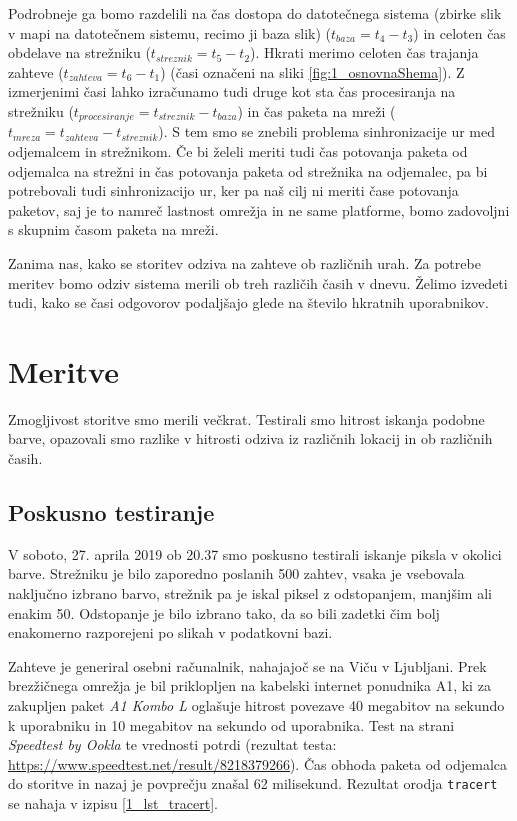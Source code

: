 Podrobneje ga bomo razdelili na čas dostopa do datotečnega sistema (zbirke slik v mapi na datotečnem sistemu, recimo ji baza slik) ($t_{baza} = t_4 - t_3$) in celoten čas obdelave na strežniku ($t_{streznik} = t_5 - t_2$). Hkrati merimo celoten čas trajanja zahteve ($t_{zahteva} = t_6 - t_1$) (časi označeni na sliki \ref{fig:1_osnovnaShema}). Z izmerjenimi časi lahko izračunamo tudi druge kot sta čas procesiranja na strežniku ($t_{procesiranje} = t_{streznik} - t_{baza}$) in čas paketa na mreži ($t_{mreza} = t_{zahteva} - t_{streznik}$). S tem smo se znebili problema sinhronizacije ur med odjemalcem in strežnikom. Če bi želeli meriti tudi čas potovanja paketa od odjemalca na strežni in čas potovanja paketa od strežnika na odjemalec, pa bi potrebovali tudi sinhronizacijo ur, ker pa naš cilj ni meriti čase potovanja paketov, saj je to namreč lastnost omrežja in ne same platforme, bomo zadovoljni s skupnim časom paketa na mreži.

Zanima nas, kako se storitev odziva na zahteve ob različnih urah. Za potrebe meritev bomo odziv sistema merili ob treh različih časih v dnevu. Želimo izvedeti tudi, kako se časi odgovorov podaljšajo glede na število hkratnih uporabnikov.

\section{Meritve}

Zmogljivost storitve smo merili večkrat.
Testirali smo hitrost iskanja podobne barve, opazovali smo razlike v hitrosti odziva iz različnih lokacij in ob različnih časih.

\subsection{Poskusno testiranje}

V soboto, 27. aprila 2019 ob 20.37 smo poskusno testirali iskanje piksla v okolici barve.
Strežniku je bilo zaporedno poslanih 500 zahtev, vsaka je vsebovala naključno izbrano barvo, strežnik pa je iskal piksel z odstopanjem, manjšim ali enakim 50.
Odstopanje je bilo izbrano tako, da so bili zadetki čim bolj enakomerno razporejeni po slikah v podatkovni bazi.

Zahteve je generiral osebni računalnik, nahajajoč se na Viču v Ljubljani.
Prek brezžičnega omrežja je bil priklopljen na kabelski internet ponudnika A1, ki za zakupljen paket \emph{A1 Kombo L} oglašuje hitrost povezave 40 megabitov na sekundo k uporabniku in 10 megabitov na sekundo od uporabnika.
Test na strani \emph{Speedtest by Ookla} te vrednosti potrdi (rezultat testa: \url{https://www.speedtest.net/result/8218379266}).
Čas obhoda paketa od odjemalca do storitve in nazaj je povprečju znašal 62 milisekund.
Rezultat orodja \texttt{tracert} se nahaja v izpisu \ref{1_lst_tracert}.

